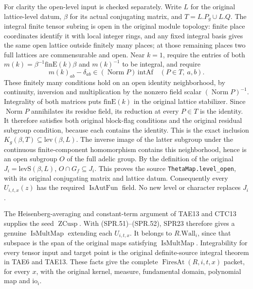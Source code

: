 \documentclass[11pt,a4paper]{article}
\numberwithin{equation}{section}
\theoremstyle{remark}\newtheorem{remark}[theorem]{Remark}
\begin{document}
For clarity the open-level input is checked separately.
Write \(L\) for the original lattice-level datum, \(\beta\) for
its actual conjugating matrix, and \(T=L.P_g\cup L.Q\).
The integral finite tensor subring is open in the original module
topology: finite place coordinates identify it with local integer
rings, and any fixed integral basis gives the same open lattice
outside finitely many places; at those remaining places two full
lattices are commensurable and open.
Near \(k=1\), require the entries of both
\(m(k)=\beta^{-1}\mathrm{finE}(k)\beta\) and \(m(k)^{-1}\)
to be integral, and require
\[
  m(k)_{ab}-\delta_{ab}
       \in(\operatorname{Norm}P)\,\mathrm{intAf}
            \quad(P\in T,\ a,b).
\]
These finitely many conditions hold on an open identity
neighborhood, by continuity, inversion and multiplication by
the nonzero field scalar \((\operatorname{Norm}P)^{-1}\).
Integrality of both matrices puts \(\mathrm{finE}(k)\) in the
original lattice stabilizer.  Since \(\operatorname{Norm}P\)
annihilates its residue field, its reduction at every \(P\in T\)
is the identity.  It therefore satisfies both original block-flag
conditions and the original residual subgroup condition, because
each contains the identity.  This is the exact inclusion
\(K_g(\beta,T)\subseteq\mathrm{lev}(\beta,L)\).
The inverse image of the latter subgroup under the continuous
finite-component homomorphism contains this neighborhood, hence
is an open subgroup \(O\) of the full adelic group.
By the definition of the original \(J_i=\mathrm{levS}(\beta,L)\),
\(O\cap G_f\subseteq J_i\).  This proves the source
\texttt{ThetaMap.\allowbreak level\_\allowbreak open}, with its original conjugating
matrix and lattice datum.  Consequently every \(U_{i,t,x}(z)\)
has the required \(\operatorname{IsAutFun}\) field.  No new
level or character replaces \(J_i\).

The Heisenberg-averaging and constant-term argument of TAE13
and CTC13 supplies the seed \(\operatorname{ZCusp}\).
With (SPR.51)--(SPR.52), SPR23 therefore gives a genuine
\(\operatorname{IsMultMap}\) extending each \(U_{i,t,x}\).
It belongs to \(R.\mathrm{Wall}_i\), since that subspace is the
span of the original maps satisfying \(\operatorname{IsMultMap}\).
Integrability for every tensor input and target point is the
original definite-source integral theorem in TAE6 and TAE13.
These facts give the complete \(\operatorname{FiresAt}(R,i,t,x)\)
packet, for every \(x\), with the original kernel, measure,
fundamental domain, polynomial map and \(\mathrm{io}_i\).
\end{document}
